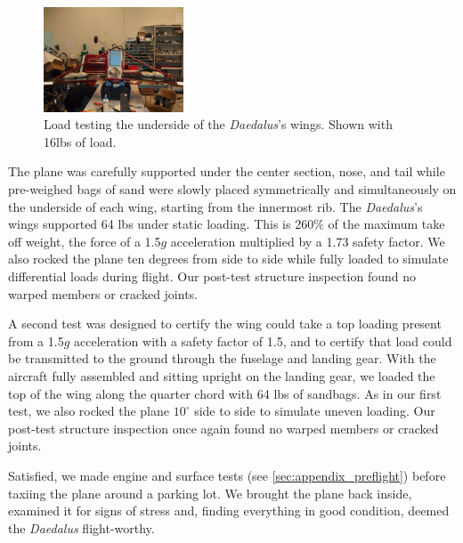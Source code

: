 \documentclass[pdftex,10pt,letter]{article}
\newcommand{\degrees}[1]
{
\begin{math}
#1^{\circ} 
\end{math}
}
\begin{document}
 \begin{figure}
	\includegraphics[width=0.37\textwidth]{../images/daedalus_sandbagtest.jpg}
	\caption{Load testing the underside of the \emph{Daedalus}'s wings. Shown with 16lbs of load.}
	\label{fig:sandbagtest}
\end{figure}
The plane was carefully supported under the center section, nose, and tail while pre-weighed bags of sand were slowly placed symmetrically and simultaneously on the underside of each wing, starting from the innermost rib.  The \emph{Daedalus}'s wings supported 64 lbs under static loading. This is 260\% of the maximum take off weight, the force of a 1.5$g$ acceleration multiplied by a 1.73 safety factor.  We also rocked the plane ten degrees from side to side while fully loaded to simulate differential loads during flight. Our post-test structure inspection found no warped members or cracked joints.

A second test was designed to certify the wing could take a top loading present from a 1.5$g$ acceleration with a safety factor of 1.5, and to certify that load could be transmitted to the ground through the fuselage and landing gear. With the aircraft fully assembled and sitting upright on the landing gear, we loaded the top of the wing along the quarter chord with 64 lbs of sandbags. As in our first test, we also rocked the plane \degrees{10} side to side to simulate uneven loading. Our post-test structure inspection once again found no warped members or cracked joints.

Satisfied, we made engine and surface tests (see \ref{sec:appendix_preflight}) before taxiing the plane around a parking lot.  We brought the plane back inside, examined it for signs of stress and, finding everything in good condition, deemed the \emph{Daedalus} flight-worthy.
\end{document}
